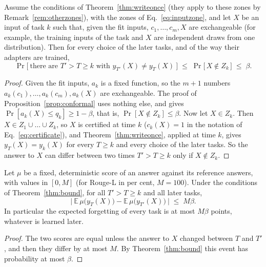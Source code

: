 \begin{theorem}
\label{thm:bound}
Assume the conditions of Theorem~\ref{thm:writeonce} (they apply to these zones by Remark~\ref{rem:otherzones}), with the zones of Eq.~\eqref{eq:inputzone},
and let $X$ be an input of task $k$ such that, given the fit inputs, $c_1, \dots, c_m, X$ are
exchangeable (for example, the training inputs of the task and $X$ are independent draws from one
distribution). Then for every choice of the later tasks, and of the way their adapters are trained,
\[
  \Pr\bigl[\ \text{there are } T' > T \ge k \text{ with } y_{T'}(X) \ne y_T(X) \ \bigr]
  \;\le\; \Pr\bigl[\, X \notin Z_k \,\bigr] \;\le\; \beta .
\]
\end{theorem}

\begin{proof}
Given the fit inputs, $a_k$ is a fixed function, so the $m+1$ numbers
$a_k(c_1), \dots, a_k(c_m), a_k(X)$ are exchangeable. The proof of
Proposition~\ref{prop:conformal} uses nothing else, and gives
$\Pr[a_k(X) \le q_k] \ge 1 - \beta$, that is, $\Pr[X \notin Z_k] \le \beta$. Now let $X \in Z_k$.
Then $X \in Z_1 \cup \dots \cup Z_k$, so $X$ is certified at time $k$ ($c_k(X) = 1$ in the notation of Eq.~\eqref{eq:certificate}), and Theorem~\ref{thm:writeonce}, applied at time $k$, gives
$y_{T}(X) = y_k(X)$ for every $T \ge k$ and every choice of the later tasks. So the answer to $X$
can differ between two times $T' > T \ge k$ only if $X \notin Z_k$.
\end{proof}

\begin{corollary}
\label{cor:bound}
Let $\mu$ be a fixed, deterministic score of an answer against its reference answers, with values
in $[0, M]$ (for Rouge-L in per cent, $M = 100$). Under the conditions of
Theorem~\ref{thm:bound}, for all $T' > T \ge k$ and all later tasks,
\[
  \bigl|\ \mathbb{E}\,\mu\bigl(y_T(X)\bigr) - \mathbb{E}\,\mu\bigl(y_{T'}(X)\bigr) \ \bigr|
  \;\le\; M \beta .
\]
In particular the expected forgetting of every task is at most $M\beta$ points, whatever is learned
later.
\end{corollary}

\begin{proof}
The two scores are equal unless the answer to $X$ changed between $T$ and $T'$, and then they differ
by at most $M$. By Theorem~\ref{thm:bound} this event has probability at most $\beta$.
\end{proof}

